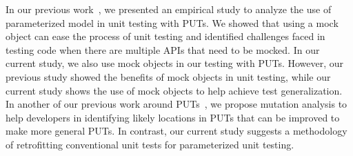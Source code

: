 In our previous work~\cite{marri09:empirical}, we presented an empirical study to analyze the use of parameterized model in unit testing with PUTs. We showed that using a mock object can ease the process
of unit testing and identified challenges faced in testing code when there are multiple APIs that need to be
mocked. In our current study, we also use mock objects in our testing with PUTs. However, our previous study showed the benefits of mock objects in unit testing, while our current study shows the use of mock objects to help achieve test generalization. In another of our previous work around PUTs~\cite{xie09:mutation}, we propose mutation analysis to help developers in identifying likely locations in PUTs that can be improved to make more general PUTs. In contrast, our current study suggests a methodology of retrofitting conventional unit tests for parameterized unit testing.